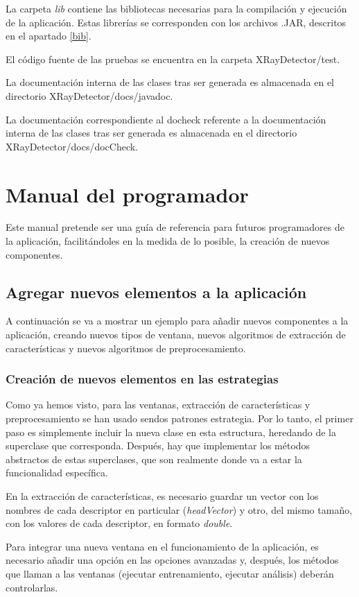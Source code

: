 La carpeta \textit{lib} contiene las bibliotecas necesarias para la compilación y ejecución de la aplicación. Estas librerías se corresponden con los archivos .JAR, descritos en el apartado \ref{bib}.

El código fuente de las pruebas se encuentra en la carpeta XRayDetector/test.

La documentación interna de las clases tras ser generada es almacenada en el directorio XRayDetector/docs/javadoc.

La documentación correspondiente al docheck referente a la documentación interna de las clases tras ser generada es almacenada en el directorio XRayDetector/docs/docCheck.

\section{Manual del programador}
Este manual pretende ser una guía de referencia para futuros programadores de la aplicación, facilitándoles en la medida de lo posible, la creación de nuevos componentes.

\subsection{Agregar nuevos elementos a la aplicación}
A continuación se va a mostrar un ejemplo para añadir nuevos componentes a la aplicación, creando nuevos tipos de ventana, nuevos algoritmos de extracción de características y nuevos algoritmos de preprocesamiento.

\subsubsection{Creación de nuevos elementos en las estrategias}
Como ya hemos visto, para las ventanas, extracción de características y preprocesamiento se han usado sendos patrones estrategia. Por lo tanto, el primer paso es simplemente incluir la nueva clase en esta estructura, heredando de la superclase que corresponda. Después, hay que implementar los métodos abstractos de estas superclases, que son realmente donde va a estar la funcionalidad específica.

En la extracción de características, es necesario guardar un vector con los nombres de cada descriptor en particular (\textit{headVector}) y otro, del mismo tamaño, con los valores de cada descriptor, en formato \textit{double}.

Para integrar una nueva ventana en el funcionamiento de la aplicación, es necesario añadir una opción en las opciones avanzadas y, después, los métodos que llaman a las ventanas (ejecutar entrenamiento, ejecutar análisis) deberán controlarlas.

